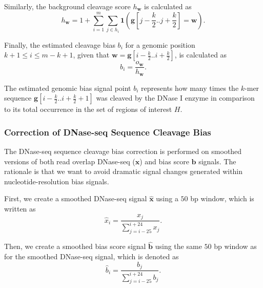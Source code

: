Similarly, the background cleavage score ${h}_{\mathbf{w}}$ is calculated as
\begin{equation}
  \label{eq:backcleav}
  {h}_{\mathbf{w}} = 1 + \sum_{i=1}^{m} \sum_{j \in h_i} \mathbf{1} \left( \mathbf{g}[j-\frac{k}{2} .. j+\frac{k}{2}] = \mathbf{w}\right).
\end{equation}

Finally, the estimated cleavage bias ${b}_{i}$ for a genomic position $k+1 \leq i \leq m-k+1$, given that $\mathbf{w}=\mathbf{g}[i-\frac{k}{2}..i+\frac{k}{2}]$, is calculated as
\begin{equation}
  \label{eq:cleavbias}
  {b}_{i} = \frac{{o}_{\mathbf{w}}}{{h}_{\mathbf{w}}}.
\end{equation}

The estimated genomic bias signal point ${b}_{i}$ represents how many times the $k$-mer sequence $\mathbf{g}[i-\frac{k}{2}..i+\frac{k}{2}+1]$ was cleaved by the DNase I enzyme in comparison to its total occurrence in the set of regions of interest $H$.

\subsubsection{Correction of DNase-seq Sequence Cleavage Bias}

The DNase-seq sequence cleavage bias correction is performed on smoothed versions of both read overlap DNase-seq ($\mathbf{x}$) and bias score $\mathbf{b}$ signals. The rationale is that we want to avoid dramatic signal changes generated within nucleotide-resolution bias signals.

First, we create a smoothed DNase-seq signal $\hat{\mathbf{x}}$ using a $50$ bp window, which is written as
\begin{equation}
  \label{eq:smoothed.raw.dnase}
  {\hat{x}}_{i} = \frac{{x}_{j}}{\sum_{j=i-25}^{i+24} {x}_{j}}.
\end{equation}

Then, we create a smoothed bias score signal $\hat{\mathbf{b}}$ using the same $50$ bp window as for the smoothed DNase-seq signal, which is denoted as
\begin{equation}
  \label{eq:smoothed.bias.signal}
  {\hat{b}}_{i} = \frac{{b}_{j}}{\sum_{j=i-25}^{i+24} {b}_{j}}.
\end{equation}

